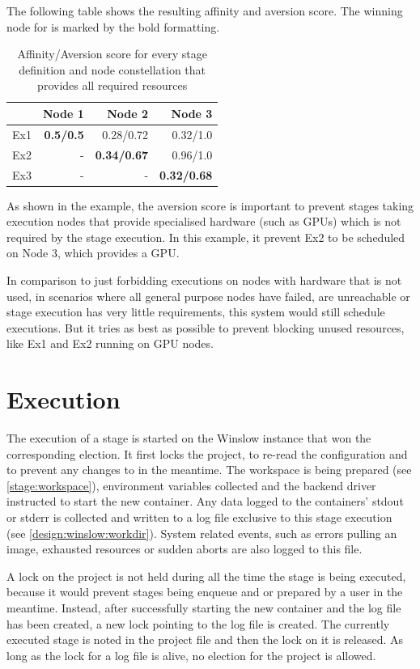 The following table shows the resulting affinity and aversion score.
The winning node for is marked by the bold formatting.


\begin{table}[H]
	\centering
	\begin{tabular}{|l|r|r|r|}\hline
		& Node 1 & Node 2 & Node 3 \\
		\hline
		Ex1 & \textbf{0.5/0.5}	& 		  0.28/0.72	& 		  0.32/1.0 \\
		Ex2 & - 				& \textbf{0.34/0.67}& 		  0.96/1.0 \\
		Ex3 & - 				& - 				& \textbf{0.32/0.68} \\\hline
	\end{tabular}
	\caption{Affinity/Aversion score for every stage definition and node constellation that provides all required resources}
\end{table}

As shown in the example, the aversion score is important to prevent stages taking execution nodes that provide specialised hardware (such as GPUs) which is not required by the stage execution.
In this example, it prevent Ex2 to be scheduled on Node 3, which provides a GPU.

In comparison to just forbidding executions on nodes with hardware that is not used, in scenarios where all general purpose nodes have failed, are unreachable or stage execution has very little requirements, this system would still schedule executions.
But it tries as best as possible to prevent blocking unused resources, like Ex1 and Ex2 running on GPU nodes.

\section{Execution}

The execution of a stage is started on the Winslow instance that won the corresponding election.
It first locks the project, to re-read the configuration and to prevent any changes to in the meantime.
The workspace is being prepared (see \autoref{stage:workspace}), environment variables collected and the backend driver instructed to start the new container.
Any data logged to the containers' stdout or stderr is collected and written to a log file exclusive to this stage execution (see \autoref{design:winslow:workdir}).
System related events, such as errors pulling an image, exhausted resources or sudden aborts are also logged to this file.

A lock on the project is not held during all the time the stage is being executed, because it would prevent stages being enqueue and or prepared by a user in the meantime.
Instead, after successfully starting the new container and the log file has been created, a new lock pointing to the log file is created.
The currently executed stage is noted in the project file and then the lock on it is released.
As long as the lock for a log file is alive, no election for the project is allowed.


